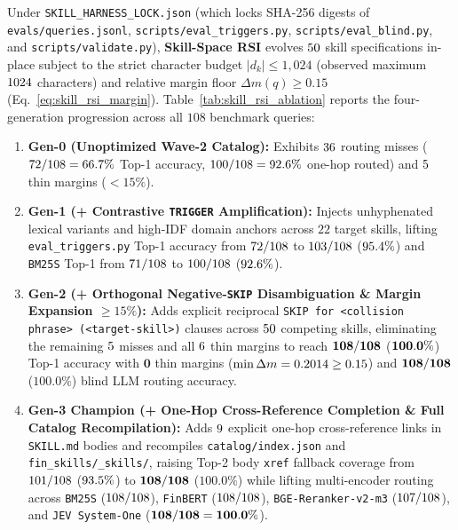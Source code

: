 Under \texttt{SKILL\_HARNESS\_LOCK.json} (which locks SHA-256 digests of \texttt{evals/\allowbreak queries.jsonl}, \texttt{scripts/\allowbreak eval\_\allowbreak triggers.py}, \texttt{scripts/\allowbreak eval\_\allowbreak blind.py}, and \texttt{scripts/\allowbreak validate.py}), \textbf{Skill-Space RSI} evolves $50{}$ skill specifications in-place subject to the strict character budget $|d_k| \le 1{,}024$ (observed maximum $1024{}$ characters) and relative margin floor $\Delta m(q) \ge 0.15$ (Eq.~\ref{eq:skill_rsi_margin}). Table~\ref{tab:skill_rsi_ablation} reports the four-generation progression across all $108$ benchmark queries:
\begin{enumerate}
\item \textbf{Gen-0 (Unoptimized Wave-2 Catalog):} Exhibits $36{}$ routing misses ($72{}/108 = 66.7{}\%$ Top-1 accuracy, $100{}/108 = 92.6{}\%$ one-hop routed) and $5{}$ thin margins ($<15\%$).
\item \textbf{Gen-1 (+ Contrastive \texttt{TRIGGER} Amplification):} Injects unhyphenated lexical variants and high-IDF domain anchors across $22$ target skills, lifting \texttt{eval\_triggers.py} Top-1 accuracy from $72{}/108$ to $103{}/108$ ($95.4{}\%$) and \texttt{BM25S} Top-1 from $71{}/108$ to $100{}/108$ ($92.6{}\%$).
\item \textbf{Gen-2 (+ Orthogonal Negative-\texttt{SKIP} Disambiguation \& Margin Expansion $\ge 15\%$):} Adds explicit reciprocal \texttt{SKIP for <collision phrase> (<target-skill>)} clauses across $50{}$ competing skills, eliminating the remaining $5{}$ misses and all $6{}$ thin margins to reach $\mathbf{108{}/108}$ ($\mathbf{100.0{}\%}$) Top-1 accuracy with $\mathbf{0}$ thin margins ($\min \Delta m = 0.2014{} \ge 0.15$) and $\mathbf{108{}/108}$ ($\mathbf{100.0\%}$) blind LLM routing accuracy.
\item \textbf{Gen-3 Champion (+ One-Hop Cross-Reference Completion \& Full Catalog Recompilation):} Adds $9{}$ explicit one-hop cross-reference links in \texttt{SKILL.md} bodies and recompiles \texttt{catalog/index.json} and \texttt{fin\_skills/\_skills/}, raising Top-2 body \texttt{xref} fallback coverage from $101{}/108$ ($93.5{}\%$) to $\mathbf{108{}/108}$ ($\mathbf{100.0\%}$) while lifting multi-encoder routing across \texttt{BM25S} ($108{}/108$), \texttt{FinBERT} ($108{}/108$), \texttt{BGE-Reranker-v2-m3} ($107{}/108$), and \texttt{JEV System-One} ($\mathbf{108{}/108 = 100.0{}\%}$).
\end{enumerate}

